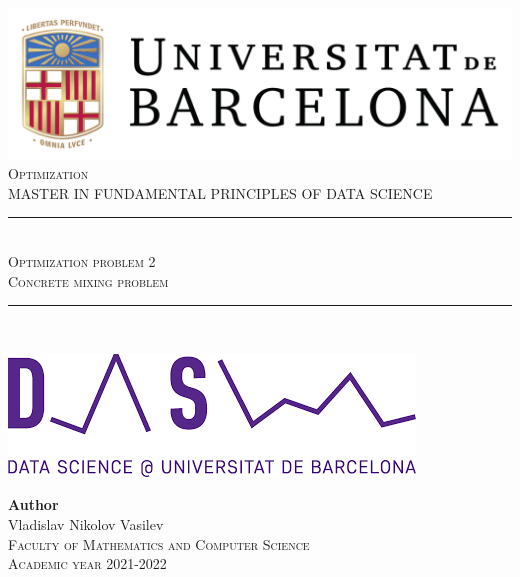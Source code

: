 \documentclass[11pt,a4paper]{article}
\newcommand{\subject}{Optimization}
\newcommand{\autor}{Vladislav Nikolov Vasilev}
\newcommand{\titulo}{Optimization problem 2}
\newcommand{\subtitulo}{Concrete mixing problem}
\newcommand{\masters}{Master in Fundamental Principles of Data Science}
\begin{document}

\begin{titlepage}
  \begin{minipage}{\textwidth}
    \centering
    \includegraphics[scale=0.25]{img/ub-logo}\\[2cm]
    
    \textsc{\Large \subject\\[0.5cm]}
    \textsc{\uppercase\expandafter{\masters}}\\[1.5cm]
    
    \noindent\rule[-1ex]{\textwidth}{1pt}\\[1.5ex]
    \textsc{{\Huge \titulo\\[0.5ex]}}
    \textsc{{\Large \subtitulo\\}}
    \noindent\rule[-1ex]{\textwidth}{2pt}\\[3.5ex]
  \end{minipage}
  
  \vspace{2cm}
  
  \begin{minipage}{\textwidth}
    \centering
    
    \includegraphics[scale=0.4]{img/ub-ds-logo}
    \vspace{2cm}
    
    \textbf{Author}\\ {\autor{}}\\[2.5ex]
    \textsc{Faculty of Mathematics and Computer Science}\\
    \vspace{1em}
    \textsc{Academic year 2021-2022}
  \end{minipage}
\end{titlepage}
\end{document}
